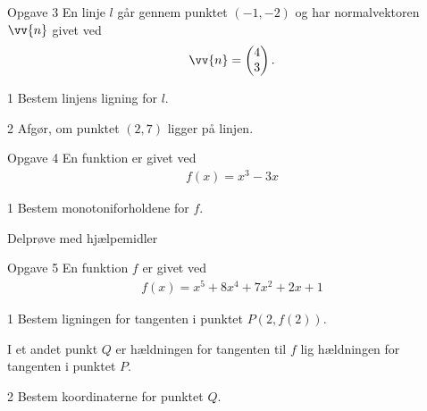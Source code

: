 \documentclass[12pt,x11names,a4paper]{article}
\begin{document}
\begin{opgavetekst}{Opgave 3}
	En linje $l$ går gennem punktet $(-1,-2)$ og har normalvektoren $\vv{n}$ givet ved
	\begin{align*}
		\vv{n} = 
		\begin{pmatrix}
			4 \\ 3
		\end{pmatrix}.
	\end{align*}	
\end{opgavetekst}
\begin{delopgave}{}{1}
	Bestem linjens ligning for $l$. 
\end{delopgave}
\begin{delopgave}{}{2}
	Afgør, om punktet $(2,7)$ ligger på linjen. 
\end{delopgave}
\newpage
\begin{opgavetekst}{Opgave 4}
	En funktion er givet ved
	\begin{align*}
		f(x) = x^3-3x
	\end{align*}
\end{opgavetekst}
\begin{delopgave}{}{1}
	Bestem monotoniforholdene for $f$.
\end{delopgave}


\newpage
\begin{center}
\LARGE
Delprøve med hjælpemidler 
\end{center}
\begin{opgavetekst}{Opgave 5}
	En funktion $f$ er givet ved
	\begin{align*}
		f(x) = x^5 + 8x^4+7x^2+2x+1
	\end{align*}
\end{opgavetekst}
\begin{delopgave}{}{1}
	Bestem ligningen for tangenten i punktet $P(2,f(2))$.
\end{delopgave}
\begin{meretekst}
	I et andet punkt $Q$ er hældningen for tangenten til $f$ lig hældningen for tangenten i punktet $P$. 
\end{meretekst}
\begin{delopgave}{}{2}
	Bestem koordinaterne for punktet $Q$.
\end{delopgave}
\end{document}
